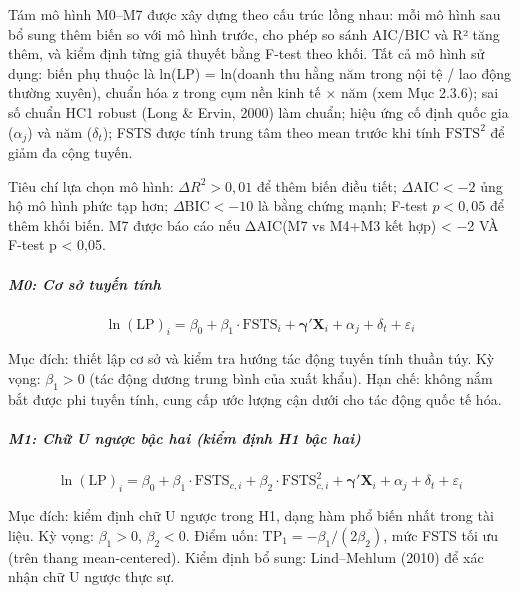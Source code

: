 \documentclass[
  a4paper,
  13pt]{extreport}
\begin{document}
Tám mô hình M0--M7 được xây dựng theo cấu trúc lồng nhau: mỗi mô hình
sau bổ sung thêm biến so với mô hình trước, cho phép so sánh AIC/BIC và
R² tăng thêm, và kiểm định từng giả thuyết bằng F-test theo khối. Tất cả
mô hình sử dụng: biến phụ thuộc là ln(LP) = ln(doanh thu hằng năm trong
nội tệ / lao động thường xuyên), chuẩn hóa z trong cụm nền kinh tế × năm
(xem Mục 2.3.6); sai số chuẩn HC1 robust (Long \& Ervin, 2000) làm
chuẩn; hiệu ứng cố định quốc gia (\(\alpha_j\)) và năm (\(\delta_t\));
FSTS được tính trung tâm theo mean trước khi tính \(\mathrm{FSTS}^2\) để
giảm đa cộng tuyến.

Tiêu chí lựa chọn mô hình: \(\Delta R^2 > 0{,}01\) để thêm biến điều
tiết; \(\Delta\mathrm{AIC} < -2\) ủng hộ mô hình phức tạp hơn;
\(\Delta\mathrm{BIC} < -10\) là bằng chứng mạnh; F-test \(p < 0{,}05\)
để thêm khối biến. M7 được báo cáo nếu ΔAIC(M7 vs M4+M3 kết hợp)
\textless{} −2 VÀ F-test p \textless{} 0,05.

\hypertarget{m0-cux1a1-sux1edf-tuyux1ebfn-tuxednh}{%
\subparagraph{M0: Cơ sở tuyến
tính}\label{m0-cux1a1-sux1edf-tuyux1ebfn-tuxednh}}

\begin{equation}
\ln(\mathrm{LP})_i = \beta_0 + \beta_1 \cdot \mathrm{FSTS}_i + \boldsymbol{\gamma}'\mathbf{X}_i + \alpha_j + \delta_t + \varepsilon_i
\label{eq:M0}
\end{equation}

Mục đích: thiết lập cơ sở và kiểm tra hướng tác động tuyến tính thuần
túy. Kỳ vọng: \(\beta_1 > 0\) (tác động dương trung bình của xuất khẩu).
Hạn chế: không nắm bắt được phi tuyến tính, cung cấp ước lượng cận dưới
cho tác động quốc tế hóa.

\hypertarget{m1-chux1eef-u-ngux1b0ux1ee3c-bux1eadc-hai-kiux1ec3m-ux111ux1ecbnh-h1-bux1eadc-hai}{%
\subparagraph{M1: Chữ U ngược bậc hai (kiểm định H1 bậc
hai)}\label{m1-chux1eef-u-ngux1b0ux1ee3c-bux1eadc-hai-kiux1ec3m-ux111ux1ecbnh-h1-bux1eadc-hai}}

\begin{equation}
\ln(\mathrm{LP})_i = \beta_0 + \beta_1 \cdot \mathrm{FSTS}_{c,i} + \beta_2 \cdot \mathrm{FSTS}_{c,i}^{2} + \boldsymbol{\gamma}'\mathbf{X}_i + \alpha_j + \delta_t + \varepsilon_i
\label{eq:M1}
\end{equation}

Mục đích: kiểm định chữ U ngược trong H1, dạng hàm phổ biến nhất trong
tài liệu. Kỳ vọng: \(\beta_1 > 0\), \(\beta_2 < 0\). Điểm uốn:
\(\mathrm{TP}_1 = -\beta_1/(2\beta_2)\), mức FSTS tối ưu (trên thang
mean-centered). Kiểm định bổ sung: Lind--Mehlum (2010) để xác nhận chữ U
ngược thực sự.
\end{document}
